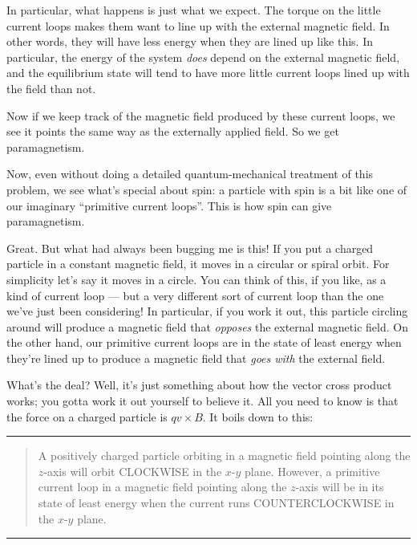 \documentclass{article}
\begin{document}
In particular, what happens is just what we expect. The torque on the
little current loops makes them want to line up with the external
magnetic field. In other words, they will have less energy when they are
lined up like this. In particular, the energy of the system \emph{does}
depend on the external magnetic field, and the equilibrium state will
tend to have more little current loops lined up with the field than not.

Now if we keep track of the magnetic field produced by these current
loops, we see it points the same way as the externally applied field. So
we get paramagnetism.

Now, even without doing a detailed quantum-mechanical treatment of this
problem, we see what's special about spin: a particle with spin is a bit
like one of our imaginary ``primitive current loops''. This is how spin
can give paramagnetism.

Great. But what had always been bugging me is this! If you put a charged
particle in a constant magnetic field, it moves in a circular or spiral
orbit. For simplicity let's say it moves in a circle. You can think of
this, if you like, as a kind of current loop --- but a very different
sort of current loop than the one we've just been considering! In
particular, if you work it out, this particle circling around will
produce a magnetic field that \emph{opposes} the external magnetic
field. On the other hand, our primitive current loops are in the state
of least energy when they're lined up to produce a magnetic field that
\emph{goes with} the external field.

What's the deal? Well, it's just something about how the vector cross
product works; you gotta work it out yourself to believe it. All you
need to know is that the force on a charged particle is
\(q v \times B\). It boils down to this:

\begin{center}\rule{0.5\linewidth}{0.5pt}\end{center}

\begin{quote}
A positively charged particle orbiting in a magnetic field pointing
along the \(z\)-axis will orbit CLOCKWISE in the \(x\)-\(y\) plane.
However, a primitive current loop in a magnetic field pointing along the
\(z\)-axis will be in its state of least energy when the current runs
COUNTERCLOCKWISE in the \(x\)-\(y\) plane.
\end{quote}

\begin{center}\rule{0.5\linewidth}{0.5pt}\end{center}
\end{document}
